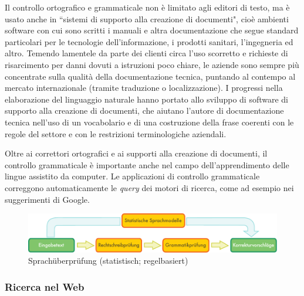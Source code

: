 \documentclass[]{../../metanetpaper}
\begin{document}
\begin{multicols}{2}
Il controllo ortografico e grammaticale non \`{e} limitato agli editori di testo, ma \`{e} usato anche in “sistemi di supporto alla creazione di documenti", cio\`{e} ambienti software con cui sono scritti i manuali e altra documentazione che segue standard particolari per le tecnologie dell'informazione, i prodotti sanitari, l'ingegneria ed altro. Temendo lamentele da parte dei clienti circa l'uso scorretto e richieste di risarcimento per danni dovuti a istruzioni poco chiare, le aziende sono sempre pi\`{u} concentrate sulla qualit\`{a} della documentazione tecnica, puntando al contempo al mercato internazionale (tramite traduzione o localizzazione). I progressi nella elaborazione del linguaggio naturale hanno portato allo sviluppo di software di supporto alla creazione di documenti, che aiutano l'autore di documentazione tecnica nell'uso di un vocabolario e di una costruzione della frase coerenti con le regole del settore e con le restrizioni terminologiche aziendali.





Oltre ai correttori ortografici e ai supporti alla creazione di documenti, il controllo grammaticale \`{e} importante anche nel campo dell'apprendimento delle lingue assistito da computer. Le applicazioni di controllo grammaticale correggono automaticamente le \emph{query} dei motori di ricerca, come ad esempio nei suggerimenti di Google.



\begin{figure}[htb]
  \center
  \includegraphics[width=\textwidth]{../_media/german/language_checking}
  \caption{Sprachüberprüfung (statistisch; regelbasiert)}
  \label{fig:langcheckingaarch_de}
\end{figure}



\subsubsection{Ricerca nel Web}


\end{multicols}
\end{document}
